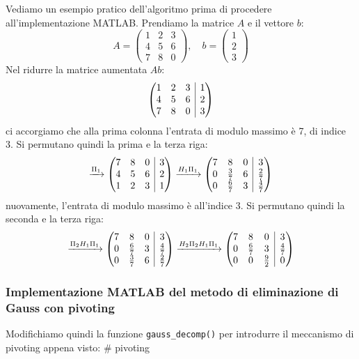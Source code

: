 \documentclass[a4paper,11pt]{article}
\begin{document}
\par\smallskip

Vediamo un esempio pratico dell'algoritmo prima di procedere all'implementazione MATLAB.
Prendiamo la matrice $A$ e il vettore $b$:
$$
A = \begin{pmatrix}
	1 & 2 & 3 \\ 
	4 & 5 & 6 \\ 
	7 & 8 & 0
\end{pmatrix}, \quad
b = \begin{pmatrix}
	1 \\ 2 \\ 3
\end{pmatrix}
$$
Nel ridurre la matrice aumentata $Ab$:
$$
\left(\begin{array}{@{}c c c | c@{}}
	1 & 2 & 3 & 1 \\ 
	4 & 5 & 6 & 2 \\ 
	7 & 8 & 0 & 3
\end{array}\right)
$$
ci accorgiamo che alla prima colonna l'entrata di modulo massimo è 7, di indice 3. Si permutano quindi la prima e la terza riga:
$$
\xrightarrow{\Pi_1}
\left(\begin{array}{@{}c c c | c@{}}
	7 & 8 & 0 & 3 \\
	4 & 5 & 6 & 2 \\ 
	1 & 2 & 3 & 1
\end{array}\right)
\xrightarrow{H_1 \Pi_1}
\left(\begin{array}{@{}c c c | c@{}}
		7 & 8 & 0 & 3 \\ 
		0 & \frac{3}{7} & 6 & \frac{2}{7} \\ 
		0 & \frac{6}{7} & 3 & \frac{4}{7}
\end{array}\right)
$$
nuovamente, l'entrata di modulo massimo è all'indice 3. Si permutano quindi la seconda e la terza riga:
$$
\xrightarrow{\Pi_2 H_1 \Pi_1}
\left(\begin{array}{@{}c c c | c@{}}
		7 & 8 & 0 & 3 \\ 
		0 & \frac{6}{7} & 3 & \frac{4}{7} \\
		0 & \frac{3}{7} & 6 & \frac{2}{7} 
\end{array}\right)
\xrightarrow{H_2 \Pi_2 H_1 \Pi_1}
\left(\begin{array}{@{}c c c | c@{}}
		7 & 8 & 0 & 3 \\ 
		0 & \frac{6}{7} & 3 & \frac{4}{7} \\
		0 & 0 & \frac{9}{2} & 0
\end{array}\right)
$$

\subsubsection{Implementazione MATLAB del metodo di eliminazione di Gauss con pivoting}
Modifichiamo quindi la funzione \lstinline|gauss_decomp()| per introdurre il meccanismo di pivoting appena visto:
# pivoting
\end{document}
